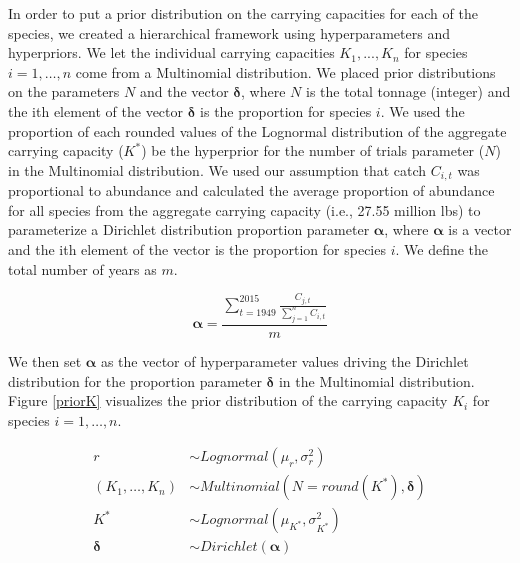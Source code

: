 \documentclass[oneside,12pt,final]{sty/ucthesis-CA2012}
\begin{document}
\begin{mainmatter}
In order to put a prior distribution on the carrying capacities for each of the species, we created a hierarchical framework using hyperparameters and hyperpriors. We let the individual carrying capacities $K_1,...,K_n$ for species  $i=1,\dots,n$ come from a Multinomial distribution. We placed prior distributions on the parameters $N$ and the vector $\boldsymbol{\delta}$, where $N$ is the total tonnage (integer) and the ith element of the vector $\boldsymbol{\delta}$ is the proportion for species $i$. We used the proportion of each rounded values of the Lognormal distribution of the aggregate carrying capacity ($K^*$) be the hyperprior for the number of trials parameter ($N$) in the Multinomial distribution. We used our assumption that catch $C_{i,t}$ was proportional to abundance and calculated the average proportion of abundance for all species from the aggregate carrying capacity (i.e., 27.55 million lbs) to parameterize a Dirichlet distribution proportion parameter $\boldsymbol{\alpha}$, where $\boldsymbol{\alpha}$ is a vector and the ith element of the vector is the proportion for species $i$. We define the total number of years as $m$.

\begin{equation*}
\boldsymbol{\alpha} = \frac{\sum_{t=1949}^{2015}\frac{C_{j,t}}{\sum_{j=1}^{n}C_{i,t}}}{m}
\end{equation*}

We then set $\boldsymbol{\alpha}$ as the vector of hyperparameter values driving the Dirichlet distribution for the proportion parameter $\boldsymbol{\delta}$ in the Multinomial distribution. Figure \ref{priorK} visualizes the prior distribution of the carrying capacity $K_i$ for species $i=1,\dots,n$.

\begin{align*}
r & \sim Lognormal(\mu_r, \sigma_r^2) \\
(K_1,\dots,K_n) & \sim Multinomial(N=round(K^*), \boldsymbol{\delta}) \\
K^* & \sim Lognormal(\mu_{K^*}, \sigma_{K^*}^2) \\
\boldsymbol{\delta} & \sim Dirichlet(\boldsymbol{\alpha})
\end{align*}


\end{mainmatter}
\end{document}
